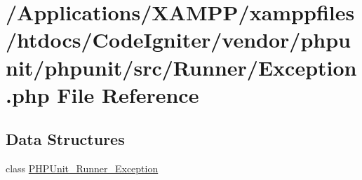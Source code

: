 \hypertarget{phpunit_2phpunit_2src_2_runner_2_exception_8php}{}\section{/\+Applications/\+X\+A\+M\+P\+P/xamppfiles/htdocs/\+Code\+Igniter/vendor/phpunit/phpunit/src/\+Runner/\+Exception.php File Reference}
\label{phpunit_2phpunit_2src_2_runner_2_exception_8php}
\subsection*{Data Structures}
\begin{DoxyCompactItemize}
\item 
class \mbox{\hyperlink{class_p_h_p_unit___runner___exception}{P\+H\+P\+Unit\+\_\+\+Runner\+\_\+\+Exception}}
\end{DoxyCompactItemize}
